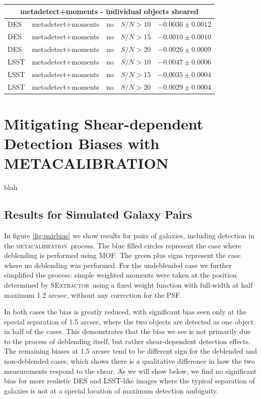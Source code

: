 \documentclass[fleqn,useAMS,usenatbib]{mnras}
\newcommand{\snr}{$S/N$}
\newcommand{\mcal}{\textsc{metacalibration}}
\newcommand{\sx}{\textsc{SExtractor}}
\begin{document}
\begin{table}
\begin{tabular}{|l|l|l|c|c|}
    \hline
    \multicolumn{5}{c}{metadetect+moments - individual objects sheared}\\
    \hline
    DES   & metadetect+moments & no & \snr$ > 10$ & $-0.0036 \pm 0.0012$  \\
    DES   & metadetect+moments & no & \snr$ > 15$ & $-0.0010 \pm 0.0010$  \\
    DES   & metadetect+moments & no & \snr$ > 20$ & $-0.0026 \pm 0.0009$  \\
    \hline
    LSST  & metadetect+moments & no & \snr$ > 10$ & $-0.0047 \pm 0.0006$  \\
    LSST  & metadetect+moments & no & \snr$ > 15$ & $-0.0035 \pm 0.0004$  \\
    LSST  & metadetect+moments & no & \snr$ > 20$ & $-0.0029 \pm 0.0004$  \\
    \hline
  \end{tabular}

\end{table}


\section{Mitigating Shear-dependent Detection Biases with \textsc{METACALIBRATION}}
blah

\subsection{Results for Simulated Galaxy Pairs} \label{sec:mdetpairs}

In figure \ref{fig:pairbias} we show results for pairs of galaxies, including
detection in the \mcal\ process.   The blue filled circles represent the case
where deblending is performed using MOF.  The green plus signs represent the
case where no deblending was performed. For the undeblended case we further
simplified the process:  simple weighted moments were taken at the position
determined by \sx\ using a fixed weight function with full-width at half maximum
1.2 arcsec, without any correction for the PSF.

In both cases the bias is greatly reduced, with significant bias seen only at
the special separation of 1.5 arcsec, where the two objects are detected as one
object in half of the cases.  This demonstrates that the bias we see is not
primarily due to the process of deblending itself, but rather shear-dependent
detection effects.  The remaining biases at 1.5 arcsec tend to be different
sign for the deblended and non-deblended cases, which shows there is a
qualitative difference in how the two measurements respond to the shear. As we
will show below, we find no significant bias for more realistic DES and
LSST-like images where the typical separation of galaxies is not at a special
location of maximum detection ambiguity.
\end{document}

